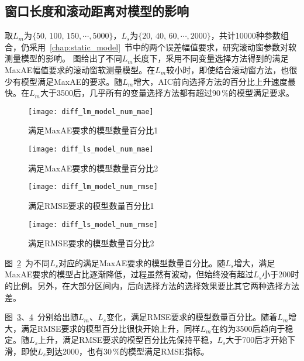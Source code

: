 \subsection{窗口长度和滚动距离对模型的影响}

取$L_{m}$为$\{\textrm{50},\,\textrm{100},\,\textrm{150},\cdots,\textrm{5000}\}$，$L_{s}$为$\{\textrm{20},\,\textrm{40},\,\textrm{60},\cdots,\textrm{2000}\}$，共计10000种参数组合，仍采用~\ref{chap:static_model}~节中的两个误差幅值要求，研究滚动窗参数对软测量模型的影响。
图给出了不同$L_{m}$长度下，采用不同变量选择方法得到的满足MaxAE幅值要求的滚动窗软测量模型。在$L_{m}$较小时，即使结合滚动窗方法，也很少有模型满足MaxAE的要求。随$L_{m}$增大，AIC前向选择方法的百分比上升速度最快。在$L_{m}$大于3500后，几乎所有的变量选择方法都有超过90$\,\%$的模型满足要求。

\begin{figure}[!hbt]
\centering
\texttt{[image: diff\_lm\_model\_num\_mae]}
\caption{满足MaxAE要求的模型数量百分比1} \label{fig:diff_lm_model_num_mae}
\end{figure}
 
 \begin{figure}[!hbt]
\centering
\texttt{[image: diff\_ls\_model\_num\_mae]}
\caption{满足MaxAE要求的模型数量百分比2} \label{fig:diff_ls_model_num_mae}
\end{figure}

\begin{figure}[!hbt]
\centering
\texttt{[image: diff\_lm\_model\_num\_rmse]}
\caption{满足RMSE要求的模型数量百分比1} \label{fig:diff_lm_model_num_rmse}
\end{figure}

\begin{figure}[!hbt]
\centering
\texttt{[image: diff\_ls\_model\_num\_rmse]}
\caption{满足RMSE要求的模型数量百分比2} \label{fig:diff_ls_model_num_rmse}
\end{figure}
   
图~\ref{fig:diff_ls_model_num_mae}~为不同$L_{s}$对应的满足MaxAE要求的模型数量百分比。随$L_{s}$增大，满足MaxAE要求的模型占比逐渐降低，过程虽然有波动，但始终没有超过$L_{s}$小于200时的比例。另外，在大部分区间内，后向选择方法的选择效果要比其它两种选择方法差。

图~\ref{fig:diff_lm_model_num_rmse}、\ref{fig:diff_ls_model_num_rmse}~分别给出随$L_{m}$、$L_{s}$变化，满足RMSE要求的模型数量百分比。随着$L_{m}$增大，满足RMSE要求的模型百分比很快开始上升，同样$L_{m}$在约为3500后趋向于稳定。随$L_{s}$上升，满足RMSE要求的模型百分比先保持平稳，$L_{s}$大于700后才开始下滑，即使$L_{s}$到达2000，也有30$\,$\si{\percent}的模型满足RMSE指标。


